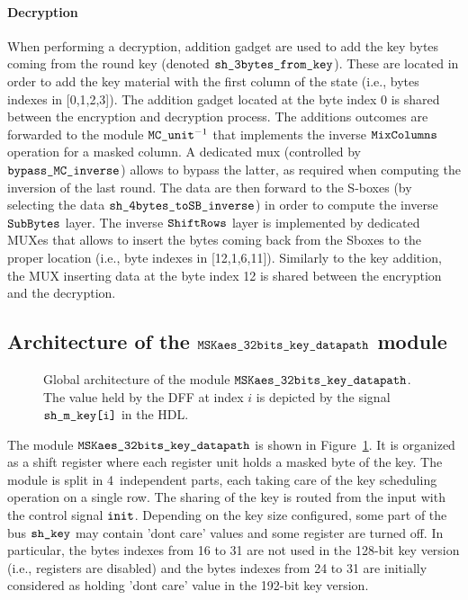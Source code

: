 \documentclass{scrartcl}
\begin{document}
\paragraph{Decryption} When performing a decryption, addition gadget are used to add the key bytes
coming from the round key (denoted
$\texttt{sh\_3bytes\_from\_key}$). These are located in order to add the key
material with the first column of the state (i.e., bytes indexes in [0,1,2,3]).
The addition gadget located at the byte index 0 is shared between the
encryption and decryption process. The additions outcomes are forwarded to the
module $\texttt{MC\_unit}^{-1}$ that implements the inverse $\texttt{MixColumns}$ operation for a
masked column. A dedicated mux (controlled by $\texttt{bypass\_MC\_inverse}$)
allows to bypass the latter, as required when computing the inversion of the
last round. The data are then forward to the S-boxes (by selecting the data
$\texttt{sh\_4bytes\_toSB\_inverse}$) in order to compute the inverse $\texttt{SubBytes}$ layer.  The
inverse $\texttt{ShiftRows}$ layer is implemented by dedicated MUXes that allows to insert the
bytes coming back from the Sboxes to the proper location (i.e., byte indexes in
[12,1,6,11]). Similarly to the key addition, the MUX inserting data at the byte
index 12 is shared between the encryption and the decryption.  

\subsection{Architecture of the $\texttt{MSKaes\_32bits\_key\_datapath}$ module}
\label{section:module_dpkey}
\begin{figure}
    \centering
    \resizebox{\textwidth}{!}{
        \begin{tikzpicture}
            
        \end{tikzpicture}
    }
    \caption{Global architecture of the module $\texttt{MSKaes\_32bits\_key\_datapath}$. The value held by the DFF at index $i$ is depicted by the signal $\texttt{sh\_m\_key[i]}$ in the HDL.}
    \label{fig:aes_dpKey}
\end{figure}

The module $\texttt{MSKaes\_32bits\_key\_datapath}$ is shown in Figure~\ref{fig:aes_dpKey}. It is
organized as a shift register where each register unit holds a masked byte of
the key. The module is split in 4~independent parts, each taking care of the
key scheduling operation on a single row. The sharing of the key is routed from
the input with the control signal $\texttt{init}$. Depending on the key size
configured, some part of the bus $\texttt{sh\_key}$ may contain 'dont care' values
and some register are turned off. In particular, the bytes indexes from 16 to
31 are not used in the 128-bit key version (i.e., registers are disabled) and
the bytes indexes from 24 to 31 are initially considered as holding 'dont care'
value in the 192-bit key version.
\end{document}

